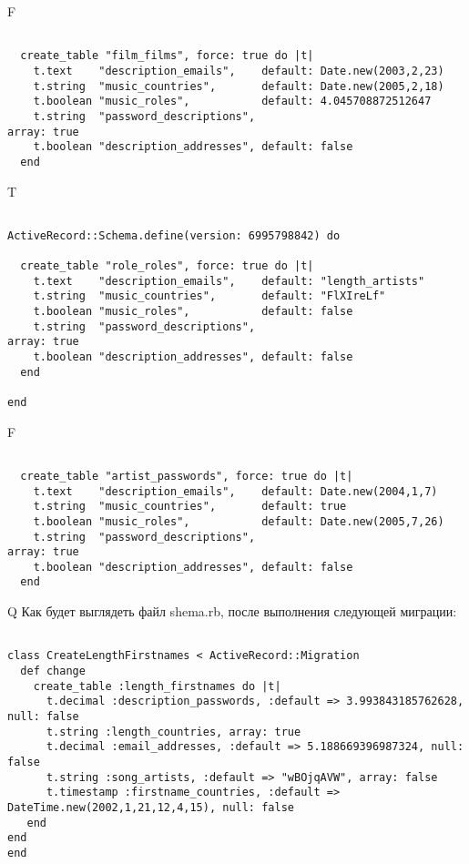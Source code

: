 F
\begin{verbatim}

  create_table "film_films", force: true do |t|
    t.text    "description_emails",    default: Date.new(2003,2,23)
    t.string  "music_countries",       default: Date.new(2005,2,18)
    t.boolean "music_roles",           default: 4.045708872512647
    t.string  "password_descriptions",                            array: true
    t.boolean "description_addresses", default: false
  end

\end{verbatim}

T
\begin{verbatim}

ActiveRecord::Schema.define(version: 6995798842) do

  create_table "role_roles", force: true do |t|
    t.text    "description_emails",    default: "length_artists"
    t.string  "music_countries",       default: "FlXIreLf"
    t.boolean "music_roles",           default: false
    t.string  "password_descriptions",                            array: true
    t.boolean "description_addresses", default: false
  end

end
\end{verbatim}


F
\begin{verbatim}

  create_table "artist_passwords", force: true do |t|
    t.text    "description_emails",    default: Date.new(2004,1,7)
    t.string  "music_countries",       default: true
    t.boolean "music_roles",           default: Date.new(2005,7,26)
    t.string  "password_descriptions",                            array: true
    t.boolean "description_addresses", default: false
  end

\end{verbatim}

Q
Как будет выглядеть файл shema.rb, после выполнения следующей миграции:

\begin{verbatim}

class CreateLengthFirstnames < ActiveRecord::Migration 
  def change 
    create_table :length_firstnames do |t| 
      t.decimal :description_passwords, :default => 3.993843185762628, null: false
      t.string :length_countries, array: true
      t.decimal :email_addresses, :default => 5.188669396987324, null: false
      t.string :song_artists, :default => "wBOjqAVW", array: false
      t.timestamp :firstname_countries, :default => DateTime.new(2002,1,21,12,4,15), null: false
   end
end
end
\end{verbatim}

